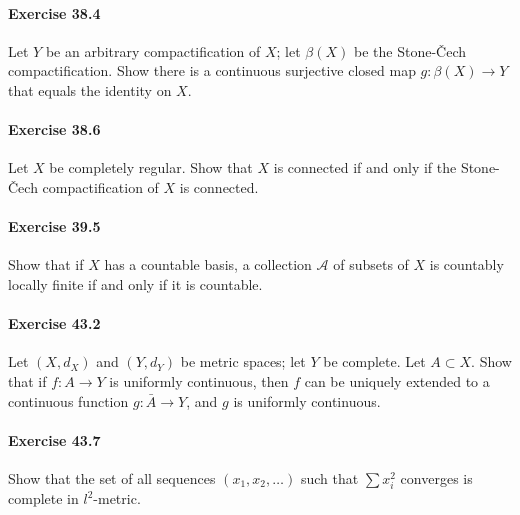 \documentclass{article}
\begin{document}
\paragraph{Exercise 38.4} Let $Y$ be an arbitrary compactification of $X$; let $\beta(X)$ be the Stone-Čech compactification. Show there is a continuous surjective closed map $g \colon \beta(X)\rightarrow Y$ that equals the identity on $X$.

\paragraph{Exercise 38.6} Let $X$ be completely regular. Show that $X$ is connected if and only if the Stone-Čech compactification of $X$ is connected.

\paragraph{Exercise 39.5} Show that if $X$ has a countable basis, a collection $\mathcal{A}$ of subsets of $X$ is countably locally finite if and only if it is countable.

\paragraph{Exercise 43.2} Let $(X, d_X)$ and $(Y, d_Y)$ be metric spaces; let $Y$ be complete. Let $A \subset X$. Show that if $f \colon A \rightarrow Y$ is uniformly continuous, then $f$ can be uniquely extended to a continuous function $g \colon \bar{A} \rightarrow Y$, and $g$ is uniformly continuous.

\paragraph{Exercise 43.7} Show that the set of all sequences $(x_1, x_2, \ldots)$ such that $\sum x_i^2$ converges is complete in $l^2$-metric.
\end{document}
